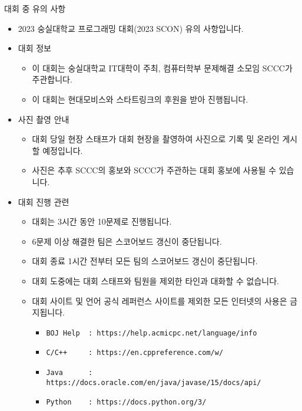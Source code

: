 {
    \indent
    \Large
    
    대회 중 유의 사항
}

\begin{itemize}[noitemsep]
    \item 2023 숭실대학교 프로그래밍 대회(2023 SCON) 유의 사항입니다.
    
    \item 대회 정보
    
    \begin{itemize}[noitemsep]
        \item 이 대회는 숭실대학교 IT대학이 주최, 컴퓨터학부 문제해결 소모임 SCCC가 주관합니다.
        \item 이 대회는 현대모비스와 스타트링크의 후원을 받아 진행됩니다.
    \end{itemize}
    
    \item 사진 촬영 안내
    
    \begin{itemize}[noitemsep]
        \item 대회 당일 현장 스태프가 대회 현장을 촬영하여 사진으로 기록 및 온라인 게시할 예정입니다.
        \item 사진은 추후 SCCC의 홍보와 SCCC가 주관하는 대회 홍보에 사용될 수 있습니다.
    \end{itemize}

    \item 대회 진행 관련

    \begin{itemize}[noitemsep]
        \item 대회는 3시간 동안 10문제로 진행됩니다.
        \item 6문제 이상 해결한 팀은 스코어보드 갱신이 중단됩니다.
        \item 대회 종료 1시간 전부터 모든 팀의 스코어보드 갱신이 중단됩니다.
        \item 대회 도중에는 대회 스태프와 팀원을 제외한 타인과 대화할 수 없습니다.
        \item 대회 사이트 및 언어 공식 레퍼런스 사이트를 제외한 모든 인터넷의 사용은 금지됩니다.

        \begin{itemize}[noitemsep]
            \item \texttt{BOJ Help \ : https://help.acmicpc.net/language/info}
            \item \texttt{C/C++ \ \ \ \ : https://en.cppreference.com/w/}
            \item \texttt{Java \ \ \ \ \ : https://docs.oracle.com/en/java/javase/15/docs/api/}
            \item \texttt{Python \ \ \ : https://docs.python.org/3/}
        \end{itemize}


\end{itemize}
\end{itemize}

